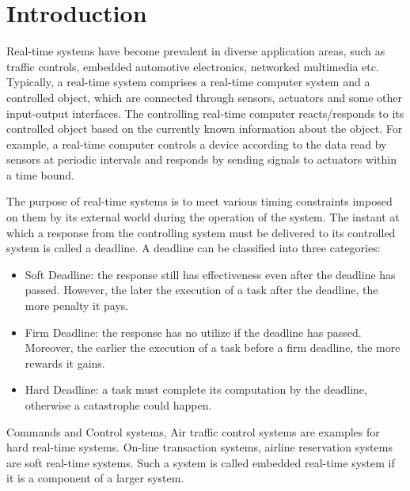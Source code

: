 \documentclass[preprint,12pt]{elsarticle}
\begin{document}

\section{Introduction} \label{S:1}

Real-time systems have become prevalent in diverse application areas, such as traffic controls, embedded automotive electronics, networked multimedia etc. Typically, a real-time system comprises a real-time computer system and a controlled object, which are connected through sensors, actuators and some other input-output interfaces. The controlling real-time computer reacts/responds to its controlled object based on the currently known information about the object. For example, a real-time computer controls a device according to the data read by sensors at periodic intervals and responds by sending signals to actuators within a time bound. 

The purpose of real-time systems is to meet various timing constraints imposed
on them by its external world during the operation of the system.
The instant at which a response from the controlling system must be delivered to its controlled system is called a deadline. A deadline can be classified into three categories\cite{mohammadi2005scheduling}:

\begin{itemize}
\item Soft Deadline: the response still has effectiveness even after the
    deadline has passed. However, the later the execution of a task after the
    deadline, the more penalty it pays.
\item Firm Deadline: the response has no utilize if the deadline has passed.
    Moreover, the earlier the execution of a task before a firm deadline, the
    more rewards it gains.

\item Hard Deadline: a task must complete its computation by the deadline, otherwise a catastrophe could happen.

\end{itemize}

Commands and Control systems, Air traffic control systems are examples for hard real-time systems. On-line transaction systems, airline reservation systems are soft real-time systems\cite{davis2011survey}. Such a system is called embedded real-time system if it is a component of a larger system.
\end{document}
